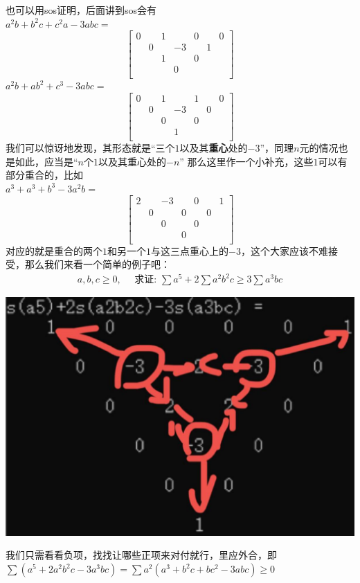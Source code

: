 \documentclass[UTF8]{ctexart}
\begin{document}
也可以用sos证明，后面讲到sos会有\label{1}\pageref{2}\\
$ a^{2}b+b^{2}c+c^{2}a-3abc= $
\renewcommand*{\arraystretch}{1.732}\[\left[\begin{matrix}
	0& & 1& &0& & 0\\
	& 0& & -3& &1 &\\
	& & 1& &0& & \\
	& & & 0& & &\\
\end{matrix}\right]\]
$ a^{2}b+ab^{2}+c^{3}-3abc= $
\renewcommand*{\arraystretch}{1.732}\[\left[\begin{matrix}
	0& & 1& &1& & 0\\
	& 0& & -3& &0 &\\
	& & 0& &0& & \\
	& & & 1& & &\\
\end{matrix}\right]\]
我们可以惊讶地发现，其形态就是“三个$ 1 $以及其\textbf{重心}处的$ -3 $”，同理$ n $元的情况也是如此，应当是“$ n $个$ 1 $以及其重心处的$ -n $”
那么这里作一个小补充，这些$ 1 $可以有部分重合的，比如\\
$ a^{3}+a^{3}+b^{3}-3a^{2}b= $
\renewcommand*{\arraystretch}{1.732}\[\left[\begin{matrix}
	2& & -3& &0& & 1\\
	& 0& & 0& &0 &\\
	& & 0& &0& & \\
	& & & 0& & &\\
\end{matrix}\right]\]
对应的就是重合的两个$ 1 $和另一个$ 1 $与这三点重心上的$ -3 $，这个大家应该不难接受，那么我们来看一个简单的例子吧：
$$
\begin{gathered}
	a, b, c \geq 0, \quad \text { 求证: } \displaystyle \sum  a^{5}+2 \displaystyle \sum  a^{2} b^{2} c \geq 3 \displaystyle \sum  a^{3} b c
\end{gathered}
$$
\begin{center}
	\includegraphics[width=0.4\linewidth]{0120}
\end{center}
我们只需看看负项，找找让哪些正项来对付就行，里应外合，即$ \displaystyle \sum  (a^{5}+2a^{2}b^{2}c-3a^{3}bc)=\displaystyle \sum  a^{2}(a^{3}+b^{2}c+bc^{2}-3abc)\ge 0 $
\end{document}
